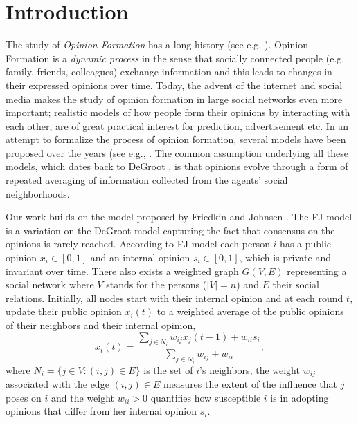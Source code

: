 \section{Introduction}

The study of \emph{Opinion Formation} has a long history (see e.g.
\cite{Jackson}). Opinion Formation is a \emph{dynamic process} in the sense
that socially connected people (e.g. family, friends, colleagues) exchange
information and this leads to changes in their expressed opinions over time.
Today, the advent of the internet and social media makes the study of opinion
formation in large social networks even more important; realistic models of how
people form their opinions by interacting with each other, are of great
practical interest for prediction, advertisement etc. In an attempt to
formalize the process of opinion formation, several models have been proposed
over the years (see e.g., \cite{DeGroot,FJ90,HK,DNAW00}.  The common assumption
underlying all these models, which dates back to DeGroot \cite{DeGroot}, is
that opinions evolve through a form of repeated averaging of information
collected from the agents' social neighborhoods.

Our work builds on the model proposed by Friedkin and Johnsen \cite{FJ90}.  The
FJ model is a variation on the DeGroot model capturing the fact that consensus
on the opinions is rarely reached.  According to FJ model each person $i$ has a
public opinion $x_i \in [0,1]$ and an internal opinion $s_i\in [0,1]$, which is
private and invariant over time. There also exists a weighted graph $G(V,E)$
representing a social network where $V$ stands for the persons ($|V|=n$) and
$E$ their social relations. Initially, all nodes start with their internal
opinion and at each round $t$, update their public opinion $x_i(t)$ to a
weighted average of the public opinions of their neighbors and their internal
opinion,
%
\begin{equation}\label{eq:FJ_model}
  x_i(t)= \frac{\sum_{j\in N_i}w_{ij}x_j(t-1) + w_{ii}s_i}{\sum_{j\in
      N_i}w_{ij}+w_{ii}},
\end{equation}
%
where $N_i =\{j \in V:(i,j) \in E\}$ is the set of $i$'s neighbors, the weight
$w_{ij}$ associated with the edge $(i,j) \in E$ measures the extent of the
influence that $j$ poses on $i$ and the weight $w_{ii}>0$ quantifies how
susceptible $i$ is in adopting opinions that differ from her internal opinion
$s_i$.

